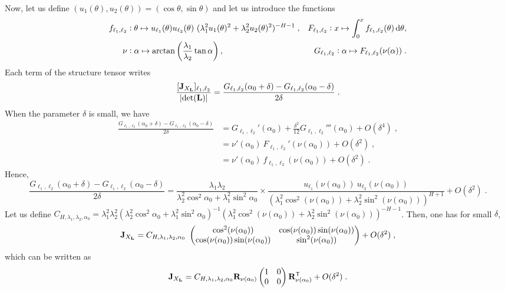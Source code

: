 \documentclass{elsarticle}
\begin{document}
\medskip

\noindent
Now, let us define $(u_1(\theta),u_2(\theta))=(\cos \theta,\sin \theta)$ and let us introduce the functions
\begin{align*}
 f_{\ell_1,\ell_2}&:\theta\mapsto u_{\ell_1}(\theta)u_{\ell_2}(\theta)~(\lambda_1^2u_1(\theta)^2+\lambda_2^2u_2(\theta)^2)^{-H-1}\;,
& F_{\ell_1,\ell_2} : x\mapsto   \int_0^x f_{\ell_1,\ell_2}(\theta)\mathop{}\mathopen{}\mathrm{d} \theta,  \\
  \nu &: \alpha\mapsto \arctan\left(\frac{\lambda_1}{\lambda_2}\tan \alpha\right),
  & G_{\ell_1,\ell_2} : \alpha\mapsto F_{\ell_1,\ell_2}(\nu (\alpha))\;. 
 \end{align*}
 Each term of the structure tensor writes
\[
\frac{[\mathbf{J}_{X_{\mathbf{L}}}]_{\ell_1,\ell_2}}{\lvert \mathrm{det}(\mathbf{L})\rvert}=\frac{G_{\ell_1,\ell_2}(\alpha_0+\delta)-G_{\ell_1,\ell_2}(\alpha_0-\delta)}{2\delta}\;.
\]
When the parameter $\delta$ is small, we have
\begin{align*}
\frac{G_{\ell_1,\ell_2}(\alpha_0+\delta)-G_{\ell_1,\ell_2}(\alpha_0-\delta)}{2\delta}&=G_{\ell_1,\ell_2}'(\alpha_0) + \frac{\delta^2}{12}G_{\ell_1,\ell_2}'''(\alpha_0) + O(\delta^4)\;
,\\
&=\nu '(\alpha_0)~F_{\ell_1,\ell_2}'(\nu (\alpha_0))+ O(\delta^2)\;,\\
&=\nu '(\alpha_0)~f_{\ell_1,\ell_2}(\nu (\alpha_0))+ O(\delta^2)\;.
\end{align*}
Hence,
\[
\frac{G_{\ell_1,\ell_2}(\alpha_0+\delta)-G_{\ell_1,\ell_2}(\alpha_0-\delta)}{2\delta}
= \frac{\lambda_1\lambda_2}{\lambda_2^2\cos^2\alpha_0+\lambda_1^2\sin^2\alpha_0}\times 
\frac{u_{\ell_1}(\nu(\alpha_0))~u_{\ell_2}(\nu(\alpha_0))}{(\lambda_1^2\cos^2(\nu(\alpha_0))+\lambda_2^2\sin^2(\nu(\alpha_0)))^{H+1}}+ O(\delta^2)\;.
\]
Let us define $C_{H,\lambda_1,\lambda_2,\alpha_0}=\lambda_1^2 \lambda_2^2 (\lambda_2^2\cos^2\alpha_0+\lambda_1^2\sin^2\alpha_0)^{-1}(\lambda_1^2\cos^2(\nu(\alpha_0))+\lambda_2^2\sin^2(\nu(\alpha_0)))^{-H-1}$.
Then, one has for small $\delta$,
\begin{equation*}
\mathbf{J}_{X_{\mathbf{L}}} = C_{H,\lambda_1,\lambda_2,\alpha_0}~ 
\begin{pmatrix}\cos^2(\nu (\alpha_0)) & \cos (\nu (\alpha_0))\sin (\nu (\alpha_0))\\  \cos (\nu (\alpha_0))\sin (\nu (\alpha_0)) & \sin^2(\nu (\alpha_0))\end{pmatrix}+ O(\delta^2)\;,
\end{equation*}
which can be written as
\[
\mathbf{J}_{X_{\mathbf{L}}} = C_{H,\lambda_1,\lambda_2,\alpha_0} \mathbf{R}_{\nu(\alpha_0)}\begin{pmatrix}1 & 0\\ 0 & 0\end{pmatrix}\mathbf{R}_{\nu(\alpha_0)}^{\mathsf{T}}+ O(\delta^2)\;.
\]
\end{document}
